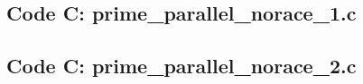 \documentclass[11pt]{article}
\begin{document}
\begin{enumerate}
{\subsection{Code C: prime\_parallel\_norace\_1.c}


\begin{footnotesize}

\end{footnotesize}



\subsection{Code C: prime\_parallel\_norace\_2.c}


\begin{footnotesize}

\end{footnotesize}





% 




% 



}
\end{enumerate}
\end{document}
